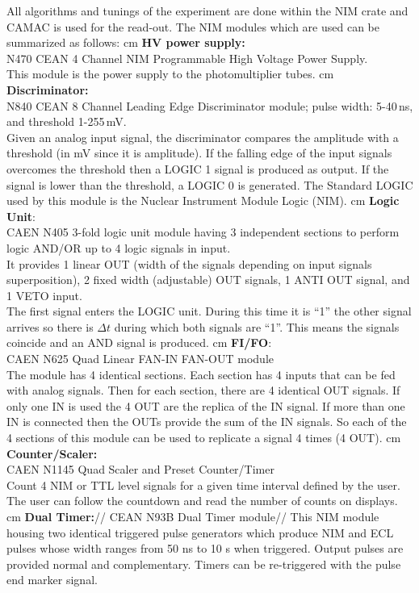     All algorithms and tunings of the experiment are done within the NIM crate and CAMAC is used
    for the read-out. The NIM modules which are used can be summarized as follows: 
	 cm
	\textbf{HV power supply:}\\ N470 CEAN 4 Channel NIM Programmable High Voltage
    Power Supply.\\
	This module is the power supply to the photomultiplier tubes.
	 cm
	\textbf{Discriminator:}\\ N840 CEAN 8 Channel Leading Edge Discriminator module; pulse width:
    5-40\,ns, and threshold 1-255\,mV.\\
	Given an analog input signal, the discriminator compares the amplitude with a threshold 
    (in mV since it is amplitude). If the falling edge of the input signals overcomes the threshold
    then a LOGIC 1 signal is produced as output. If the signal is lower than the threshold,
    a LOGIC 0 is generated. The Standard LOGIC used by this module is the Nuclear Instrument
    Module Logic (NIM).
	 cm
	\textbf{Logic Unit}:\\ CAEN N405 3-fold logic unit module having 3 independent sections to
    perform logic AND/OR up to 4 logic signals in input.\\
	It provides 1 linear OUT (width of the signals depending on input signals superposition),
    2 ﬁxed width (adjustable) OUT signals, 1 ANTI OUT signal, and 1 VETO input.\\
	The ﬁrst signal enters the LOGIC unit. During this time it is “1” the other signal arrives
    so there is $\Delta t$ during which both signals are “1”. 
    This means the signals coincide and an AND signal is produced.
	 cm
	\textbf{FI/FO}:\\ CAEN N625 Quad Linear FAN-IN FAN-OUT module\\
	The module has 4 identical sections. Each section has 4 inputs that can be fed with analog
    signals. Then for each section, there are 4 identical OUT signals. If only one IN is used the
    4 OUT are the replica of the IN signal. If more than one IN is connected then the OUTs provide
    the sum of the IN signals. So each of the 4 sections of this module can be used to replicate 
    a signal 4 times (4 OUT).
	 cm
	\textbf{Counter/Scaler:}\\ CAEN N1145 Quad Scaler and Preset Counter/Timer\\
	Count 4 NIM or TTL level signals for a given time interval deﬁned by the user.
    The user can follow the countdown and read the number of counts on displays.
    	 cm
	\textbf{Dual Timer:}// CEAN N93B Dual Timer module//
	This NIM module housing two identical triggered pulse generators which produce NIM and ECL pulses whose width ranges from 50 ns to 10 s when 	triggered. Output pulses are provided normal and complementary. Timers can be re-triggered with the pulse end marker signal.
	

